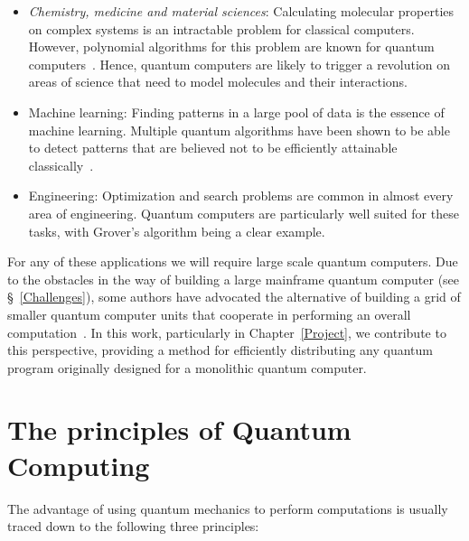 \begin{itemize}
  \item \textit{Chemistry, medicine and material sciences}: Calculating molecular properties on complex systems is an intractable problem for classical computers. However, polynomial algorithms for this problem are known for quantum computers~\citep{TowardsQuantumChemistry}. Hence, quantum computers are likely to trigger a revolution on areas of science that need to model molecules and their interactions.
  \item Machine learning: Finding patterns in a large pool of data is the essence of machine learning. Multiple quantum algorithms have been shown to be able to detect patterns that are believed not to be efficiently attainable classically~\citep{QuantumMachineLearning}.
  \item Engineering: Optimization and search problems are common in almost every area of engineering. Quantum computers are particularly well suited for these tasks, with Grover's algorithm being a clear example.
\end{itemize}

For any of these applications we will require large scale quantum computers. Due to the obstacles in the way of building a large mainframe quantum computer (see \S~\ref{Challenges}), some authors have advocated the alternative of building a grid of smaller quantum computer units that cooperate in performing an overall computation~\citep{DistributedQCHW}. In this work, particularly in Chapter~\ref{Project}, we contribute to this perspective, providing a method for efficiently distributing any quantum program originally designed for a monolithic quantum computer.

\section{The principles of Quantum Computing}
\label{Principles}

The advantage of using quantum mechanics to perform computations is usually traced down to the following three principles:

